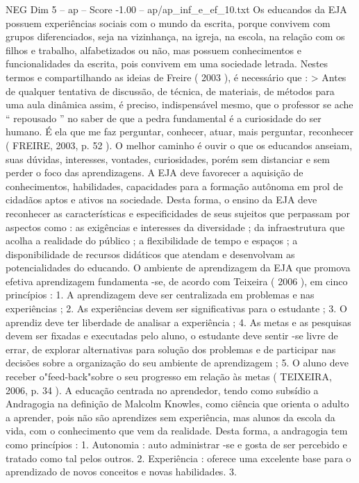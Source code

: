 \begin{textsample}{NEG Dim 5 – ap – Score -1.00 – ap/ap\_inf\_e\_ef\_10.txt}
Os educandos da EJA possuem experiências sociais com o mundo da escrita, porque convivem com grupos diferenciados, seja na vizinhança, na igreja, na escola, na relação com os filhos e trabalho, alfabetizados ou não, mas possuem conhecimentos e funcionalidades da escrita, pois convivem em uma sociedade letrada.
Nestes termos e compartilhando as ideias de Freire ( 2003 ), é necessário que : > Antes de qualquer tentativa de discussão, de técnica, de materiais, de métodos para uma aula dinâmica assim, é preciso, indispensável mesmo, que o professor se ache “ repousado ” no saber de que a pedra fundamental é a curiosidade do ser humano.
É ela que me faz perguntar, conhecer, atuar, mais perguntar, reconhecer ( FREIRE, 2003, p. 52 ).
O melhor caminho é ouvir o que os educandos anseiam, suas dúvidas, interesses, vontades, curiosidades, porém sem distanciar e sem perder o foco das aprendizagens.
A EJA deve favorecer a aquisição de conhecimentos, habilidades, capacidades para a formação autônoma em prol de cidadãos aptos e ativos na sociedade.
Desta forma, o ensino da EJA deve reconhecer as características e especificidades de seus sujeitos que perpassam por aspectos como : as exigências e interesses da diversidade ; da infraestrutura que acolha a realidade do público ; a flexibilidade de tempo e espaços ; a disponibilidade de recursos didáticos que atendam e desenvolvam as potencialidades do educando.
O ambiente de aprendizagem da EJA que promova efetiva aprendizagem fundamenta -se, de acordo com Teixeira ( 2006 ), em cinco princípios : 1.
A aprendizagem deve ser centralizada em problemas e nas experiências ; 2.
As experiências devem ser significativas para o estudante ; 3.
O aprendiz deve ter liberdade de analisar a experiência ; 4.
As metas e as pesquisas devem ser fixadas e executadas pelo aluno, o estudante deve sentir -se livre de errar, de explorar alternativas para solução dos problemas e de participar nas decisões sobre a organização do seu ambiente de aprendizagem ; 5.
O aluno deve receber o"feed-back"sobre o seu progresso em relação às metas ( TEIXEIRA, 2006, p. 34 ).
A educação centrada no aprendedor, tendo como subsídio a Andragogia na definição de Malcolm Knowles, como ciência que orienta o adulto a aprender, pois não são aprendizes sem experiência, mas alunos da escola da vida, com o conhecimento que vem da realidade.
Desta forma, a andragogia tem como princípios : 1.
Autonomia : auto administrar -se e gosta de ser percebido e tratado como tal pelos outros. 2.
Experiência : oferece uma excelente base para o aprendizado de novos conceitos e novas habilidades. 3.

\end{textsample}

